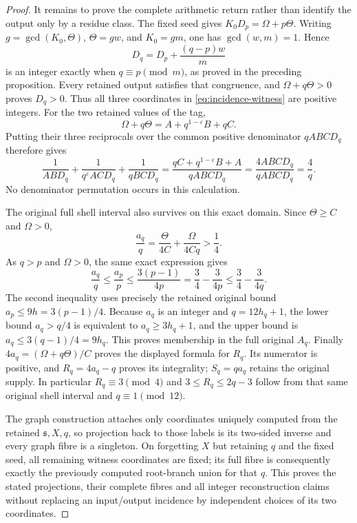 \begin{proof}
It remains to prove the complete arithmetic return rather than
identify the output only by a residue class.
The fixed seed gives
\(K_0D_p=\Omega+p\Theta\).
Writing \(g=\gcd(K_0,\Theta)\), \(\Theta=gw\), and
\(K_0=gm\), one has \(\gcd(w,m)=1\).  Hence
\[
 D_q=D_p+\frac{(q-p)w}{m}
\]
is an integer exactly when \(q\equiv p\pmod m\), as proved
in the preceding proposition.  Every retained output satisfies
that congruence, and \(\Omega+q\Theta>0\) proves \(D_q>0\).
Thus all three coordinates in \eqref{eq:incidence-witness} are
positive integers.  For the two retained values of the tag,
\[
 \Omega+q\Theta=A+q^{1-\varepsilon}B+qC.
\]
Putting their three reciprocals over the common positive
denominator \(qABCD_q\) therefore gives
\[
 \frac1{ABD_q}+\frac1{q^\varepsilon ACD_q}
                 +\frac1{qBCD_q}
 =\frac{qC+q^{1-\varepsilon}B+A}{qABCD_q}
 =\frac{4ABCD_q}{qABCD_q}=\frac4q.
\]
No denominator permutation occurs in this calculation.

The original full shell interval also survives on this exact
domain.  Since \(\Theta\ge C\) and \(\Omega>0\),
\[
 \frac{a_q}{q}=\frac{\Theta}{4C}+\frac{\Omega}{4Cq}
                    >\frac14.
\]
As \(q>p\) and \(\Omega>0\), the same exact expression gives
\[
 \frac{a_q}{q}
 \le\frac{a_p}{p}
 \le\frac{3(p-1)}{4p}
 =\frac34-\frac{3}{4p}
 \le\frac34-\frac{3}{4q}.
\]
The second inequality uses precisely the retained original bound
\(a_p\le9h=3(p-1)/4\).
Because \(a_q\) is an integer and \(q=12h_q+1\), the lower
bound \(a_q>q/4\) is equivalent to \(a_q\ge3h_q+1\), and
the upper bound is \(a_q\le3(q-1)/4=9h_q\).
This proves membership in the full original \(A_q\).
Finally \(4a_q=(\Omega+q\Theta)/C\) proves the displayed
formula for \(R_q\).  Its numerator is positive, and
\(R_q=4a_q-q\) proves its integrality; \(S_q=qa_q\) retains
the original supply.  In particular \(R_q\equiv3\pmod4\)
and \(3\le R_q\le2q-3\) follow from that same original
shell interval and \(q\equiv1\pmod{12}\).

The graph construction attaches only coordinates uniquely
computed from the retained \(\mathfrak s,X,q\), so projection
back to those labels is its two-sided inverse and every graph
fibre is a singleton.  On forgetting \(X\) but retaining \(q\)
and the fixed seed, all remaining witness coordinates are fixed;
its full fibre is consequently exactly the previously computed
root-branch union for that \(q\).  This proves the stated
projections, their complete fibres and all integer reconstruction
claims without replacing an input/output incidence by independent
choices of its two coordinates.
\end{proof}

